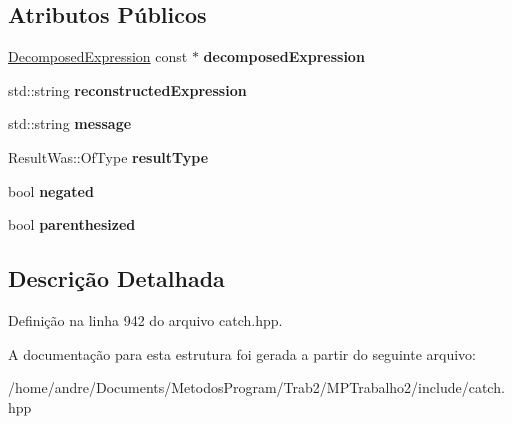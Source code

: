 \subsection*{Atributos Públicos}
\begin{DoxyCompactItemize}
\item 
\hyperlink{structCatch_1_1DecomposedExpression}{Decomposed\+Expression} const $\ast$ {\bfseries decomposed\+Expression}\hypertarget{structCatch_1_1AssertionResultData_a45b2bf2ed11da83d09dd78a2b7a44cd4}{}\label{structCatch_1_1AssertionResultData_a45b2bf2ed11da83d09dd78a2b7a44cd4}

\item 
std\+::string {\bfseries reconstructed\+Expression}\hypertarget{structCatch_1_1AssertionResultData_a9e809d36fffbeb1c7d0cbe7382dd9595}{}\label{structCatch_1_1AssertionResultData_a9e809d36fffbeb1c7d0cbe7382dd9595}

\item 
std\+::string {\bfseries message}\hypertarget{structCatch_1_1AssertionResultData_ac34215803c4c4a88f795879f61c1f7b4}{}\label{structCatch_1_1AssertionResultData_ac34215803c4c4a88f795879f61c1f7b4}

\item 
Result\+Was\+::\+Of\+Type {\bfseries result\+Type}\hypertarget{structCatch_1_1AssertionResultData_a7ceab4a7ff722aec5587e3748caf66b7}{}\label{structCatch_1_1AssertionResultData_a7ceab4a7ff722aec5587e3748caf66b7}

\item 
bool {\bfseries negated}\hypertarget{structCatch_1_1AssertionResultData_a17773c6f999cfded12e470b0321694a1}{}\label{structCatch_1_1AssertionResultData_a17773c6f999cfded12e470b0321694a1}

\item 
bool {\bfseries parenthesized}\hypertarget{structCatch_1_1AssertionResultData_a8418e3744b5486cb7f0d79c84569078e}{}\label{structCatch_1_1AssertionResultData_a8418e3744b5486cb7f0d79c84569078e}

\end{DoxyCompactItemize}


\subsection{Descrição Detalhada}


Definição na linha 942 do arquivo catch.\+hpp.



A documentação para esta estrutura foi gerada a partir do seguinte arquivo\+:\begin{DoxyCompactItemize}
\item 
/home/andre/\+Documents/\+Metodos\+Program/\+Trab2/\+M\+P\+Trabalho2/include/catch.\+hpp\end{DoxyCompactItemize}
